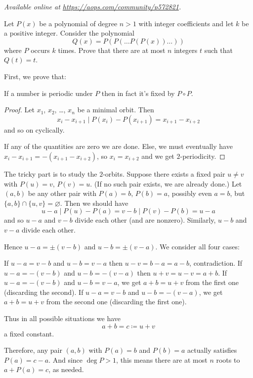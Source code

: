 \textsl{Available online at \url{https://aops.com/community/p572821}.}
\begin{mdframed}[style=mdpurplebox,frametitle={Problem statement}]
Let $P(x)$ be a polynomial of degree $n > 1$
with integer coefficients and let $k$ be a positive integer.
Consider the polynomial
\[ Q(x) = P(P(\dots P(P(x)) \dots )) \] where $P$ occurs $k$ times.
Prove that there are at most $n$ integers $t$ such that $Q(t) = t$.
\end{mdframed}
First, we prove that:
\begin{claim*}
  [Putnam 2000 et al]
  If a number is periodic under $P$
  then in fact it's fixed by $P \circ P$.
\end{claim*}
\begin{proof}
  Let $x_1$, $x_2$, \dots, $x_n$ be a minimal orbit.
  Then
  \[ x_i - x_{i+1} \mid P(x_i) - P(x_{i+1})
    = x_{i+1} - x_{i+2} \]
  and so on cyclically.

  If any of the quantities are zero we are done.
  Else, we must eventually have $x_i - x_{i+1} = -(x_{i+1} - x_{i+2})$,
  so $x_i = x_{i+2}$ and we get $2$-periodicity.
\end{proof}

The tricky part is to study the $2$-orbits.
Suppose there exists a fixed pair $u \neq v$
with $P(u) = v$, $P(v) = u$.
(If no such pair exists, we are already done.)
Let $(a,b)$ be any other pair with $P(a) = b$, $P(b) = a$,
possibly even $a = b$, but $\{a,b\} \cap \{u,v\} = \varnothing$.
Then we should have
\[ u-a \mid P(u)-P(a) = v-b
  \mid P(v) - P(b) = u-a \]
and so $u-a$ and $v-b$ divide each other (and are nonzero).
Similarly, $u-b$ and $v-a$ divide each other.

Hence $u-a = \pm (v-b)$ and $u-b = \pm (v-a)$.
We consider all four cases:
\begin{itemize}
  \ii If $u-a = v-b$ and $u-b = v-a$
  then $u-v = b-a = a-b$, contradiction.
  \ii If $u-a = -(v-b)$ and $u-b = -(v-a)$
  then $u+v = u-v = a+b$.
  \ii If $u-a = -(v-b)$ and $u-b = v-a$,
  we get $a+b = u+v$ from the first one
  (discarding the second).
  \ii If $u-a = v-b$ and $u-b = -(v-a)$,
  we get $a+b = u+v$ from the second one
  (discarding the first one).
\end{itemize}
Thus in all possible situations we have
\[ a+b = c \coloneqq u+v \]
a fixed constant.

Therefore, any pair $(a,b)$ with $P(a) = b$
and $P(b) = a$ actually satisfies $P(a) = c-a$.
And since $\deg P > 1$,
this means there are at most $n$ roots to $a+P(a)=c$, as needed.
\pagebreak